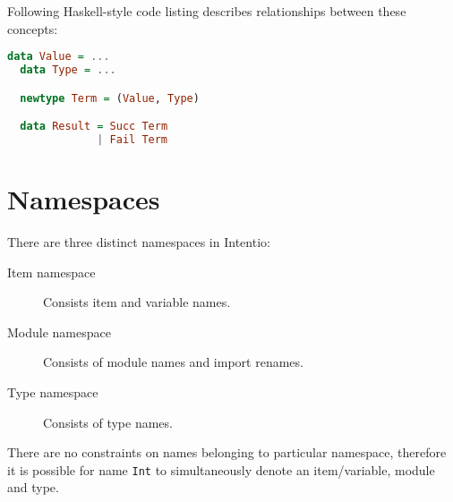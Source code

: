 Following Haskell-style code listing describes relationships between these concepts:

\begin{lstlisting}[language=Haskell]
  data Value = ...
  data Type = ...

  newtype Term = (Value, Type)

  data Result = Succ Term
              | Fail Term
\end{lstlisting}


\section{Namespaces}

There are three distinct namespaces in Intentio:

\begin{description}
  \item [Item namespace] Consists item and variable names.
  \item [Module namespace] Consists of module names and import renames.
  \item [Type namespace] Consists of type names.
\end{description}

There are no constraints on names belonging to particular namespace, therefore it is possible for name \texttt{Int} to simultaneously denote an item/variable, module and type.
